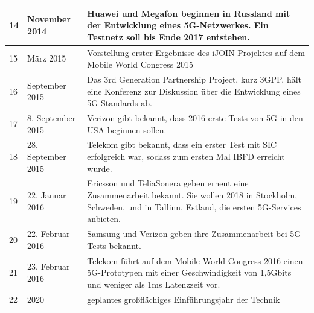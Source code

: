 \begin{tabular}{|p{1 cm}|p{3 cm}|p{13.55 cm}|}
	\hline
	14 & November 2014 & Huawei und Megafon beginnen in Russland mit der Entwicklung eines 5G-Netzwerkes. Ein Testnetz soll bis Ende 2017 entstehen. \\
	\hline
	15 & März 2015 & Vorstellung erster Ergebnisse des iJOIN-Projektes auf dem Mobile World Congress 2015 \\
	\hline
	16 & September 2015 & Das 3rd Generation Partnership Project, kurz 3GPP, hält eine Konferenz zur Diskussion über die Entwicklung eines 5G-Standards ab. \\
	\hline
	17 & 8. September 2015 & Verizon gibt bekannt, dass 2016 erste Tests von 5G in den USA beginnen sollen. \\
	\hline
	18 & 28. September 2015 & Telekom gibt bekannt, dass ein erster Test mit SIC erfolgreich war, sodass zum ersten Mal IBFD erreicht wurde. \cite{5g.2} \\
	\hline
	19 & 22. Januar 2016 & Ericsson und TeliaSonera geben erneut eine Zusammenarbeit bekannt. Sie wollen 2018 in Stockholm, Schweden, und in Tallinn, Estland, die ersten 5G-Services anbieten. \\
	\hline
	20 & 22. Februar 2016 & Samsung und Verizon geben ihre Zusammenarbeit bei 5G-Tests bekannt. \\
	\hline
	21 & 23. Februar 2016 & Telekom führt auf dem Mobile World Congress 2016 einen 5G-Prototypen mit einer Geschwindigkeit von 1,5Gbits und weniger als 1ms Latenzzeit vor. \cite{5g.4}\\
	\hline
	22 & 2020 & geplantes großflächiges Einführungsjahr der Technik \\
	\hline
\end{tabular}
\par
